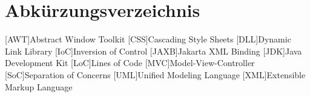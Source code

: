 \chapter*{Abkürzungsverzeichnis}
\label{abkürzungsverzeichnis}

\begin{acronym}
	[AWT]{Abstract Window Toolkit}
	[CSS]{Cascading Style Sheets}
	[DLL]{Dynamic Link Library}
	[IoC]{Inversion of Control}
	[JAXB]{Jakarta XML Binding}
	[JDK]{Java Development Kit}
	[LoC]{Lines of Code}
	[MVC]{Model-View-Controller}
	[SoC]{Separation of Concerns}
	[UML]{Unified Modeling Language}
	[XML]{Extensible Markup Language}
\end{acronym}

